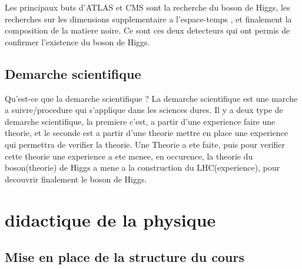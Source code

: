\documentclass[a4paper,12pt,oneside,openright]{book} %
\begin{document}
        Les principaux buts d'ATLAS et CMS sont la recherche du boson de Higgs, les recherches sur les dimensions supplementaire a l'espace-temps , et finalement la composition de la matiere noire. 
        Ce sont ces deux detecteurs qui ont permis de confirmer l'existence du boson de Higgs.
        
        \subsection{Demarche scientifique}
        Qu'est-ce que la demarche scientifique ? La demarche scientifique est une marche a suivre/procedure qui s'applique dans les sciences dures. Il y a deux type de demarche scientifique, la premiere c'est, a partir d'une experience faire une theorie, et le seconde est a partir d'une theorie mettre en place une experience qui permettra de verifier la theorie. Une Theorie a ete faite, puis pour verifier cette theorie une experience a ete menee, en occurence, la theorie du boson(theorie) de Higgs a mene a la construction du LHC(experience), pour decouvrir finalement le boson de Higgs.
        
    \section{didactique de la physique}
        \subsection{Mise en place de la structure du cours}

        

\end{document}
